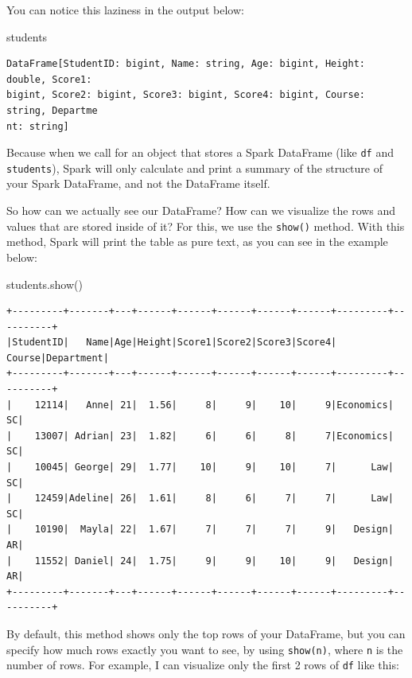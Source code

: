 \documentclass[
  11pt,
  letterpaper,
  DIV=11,
  numbers=noendperiod]{scrreprt}
\newenvironment{Shaded}{\begin{snugshade}}{\end{snugshade}}
\newcommand{\NormalTok}[1]{\textcolor[rgb]{0.00,0.23,0.31}{#1}}
\begin{document}
You can notice this laziness in the output below:

\begin{Shaded}
\begin{Highlighting}[]
\NormalTok{students}
\end{Highlighting}
\end{Shaded}

\begin{verbatim}
DataFrame[StudentID: bigint, Name: string, Age: bigint, Height: double, Score1: 
bigint, Score2: bigint, Score3: bigint, Score4: bigint, Course: string, Departme
nt: string]
\end{verbatim}

Because when we call for an object that stores a Spark DataFrame (like
\texttt{df} and \texttt{students}), Spark will only calculate and print
a summary of the structure of your Spark DataFrame, and not the
DataFrame itself.

So how can we actually see our DataFrame? How can we visualize the rows
and values that are stored inside of it? For this, we use the
\texttt{show()} method. With this method, Spark will print the table as
pure text, as you can see in the example below:

\begin{Shaded}
\begin{Highlighting}[]
\NormalTok{students.show()}
\end{Highlighting}
\end{Shaded}

\begin{verbatim}
+---------+-------+---+------+------+------+------+------+---------+----------+
|StudentID|   Name|Age|Height|Score1|Score2|Score3|Score4|   Course|Department|
+---------+-------+---+------+------+------+------+------+---------+----------+
|    12114|   Anne| 21|  1.56|     8|     9|    10|     9|Economics|        SC|
|    13007| Adrian| 23|  1.82|     6|     6|     8|     7|Economics|        SC|
|    10045| George| 29|  1.77|    10|     9|    10|     7|      Law|        SC|
|    12459|Adeline| 26|  1.61|     8|     6|     7|     7|      Law|        SC|
|    10190|  Mayla| 22|  1.67|     7|     7|     7|     9|   Design|        AR|
|    11552| Daniel| 24|  1.75|     9|     9|    10|     9|   Design|        AR|
+---------+-------+---+------+------+------+------+------+---------+----------+
\end{verbatim}

By default, this method shows only the top rows of your DataFrame, but
you can specify how much rows exactly you want to see, by using
\texttt{show(n)}, where \texttt{n} is the number of rows. For example, I
can visualize only the first 2 rows of \texttt{df} like this:
\end{document}
